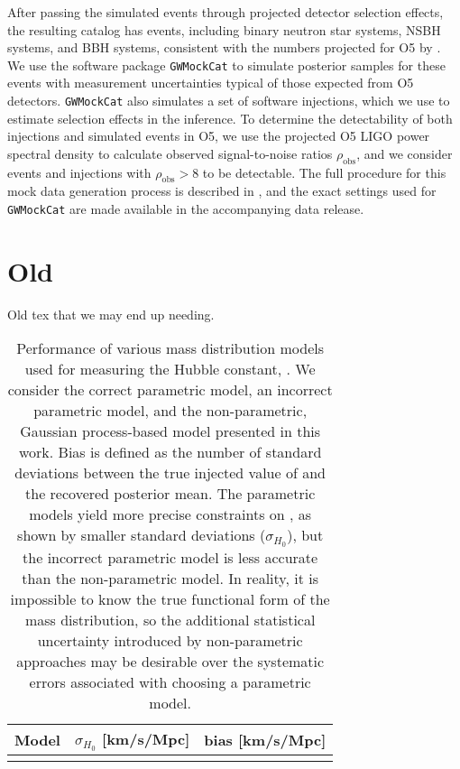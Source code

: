 \documentclass[]{aastex631}
\begin{document}
After passing the simulated events through projected detector selection effects, the resulting catalog has events, including  binary neutron star systems,  NSBH systems, and  BBH systems, consistent with the numbers projected for O5 by \citet{kiendrebogo_observing_2023}.
We use the software package \texttt{GWMockCat} \citep{farah_things_2023} to simulate posterior samples for these events with measurement uncertainties typical of those expected from O5 detectors.
\texttt{GWMockCat} also simulates a set of software injections, which we use to estimate selection effects in the inference.
To determine the detectability of both injections and simulated events in O5, we use the projected O5 LIGO power spectral density \citep{dccpage} to calculate observed signal-to-noise ratios $\rho_{\text{obs}}$, and we consider events and injections with $\rho_{\text{obs}}>8$ to be detectable. 
The full procedure for this mock data generation process is described in \citet{fishbach_where, farah_things_2023, essick_dagnabbit_2023}, and the exact settings used for \texttt{GWMockCat} are made available in the accompanying data release. 

\section{Old}
Old tex that we may end up needing.

\begin{table}[]
    \centering
    \begin{tabular}{c|c c}
         Model & $\sigma_{H_0}$ [km/s/Mpc] & bias [km/s/Mpc]\\
         \hline
         & 
    \end{tabular}
    \caption{Performance of various mass distribution models used for measuring the Hubble constant, \Ho.
    We consider the correct parametric model, an incorrect parametric model, and the non-parametric, Gaussian process-based model presented in this work.
    Bias is defined as the number of standard deviations between the true injected value of \Ho and the recovered posterior mean. 
    The parametric models yield more precise constraints on \Ho{}, as shown by smaller standard deviations ($\sigma_{H_0}$), but the incorrect parametric model is less accurate than the non-parametric model.
    In reality, it is impossible to know the true functional form of the mass distribution, so the additional statistical uncertainty introduced by non-parametric approaches may be desirable over the systematic errors associated with choosing a parametric model.
    }
    \label{tab:bias}
\end{table}
\end{document}
